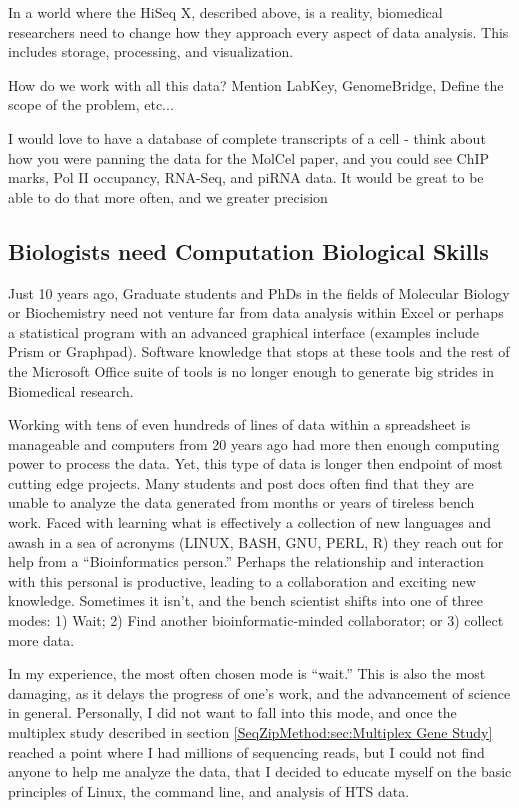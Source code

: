     In a world where the HiSeq X, described above, is a reality, biomedical researchers need to change how they approach every aspect of data analysis. This includes storage, processing, and visualization. 

    How do we work with all this data? Mention LabKey, GenomeBridge, Define the scope of the problem, etc...

    I would love to have a database of complete transcripts of a cell - think about how you were panning the data for the MolCel paper, and you could see ChIP marks, Pol II occupancy, RNA-Seq, and piRNA data. It would be great to be able to do that more often, and we greater precision

  \subsection{Biologists need Computation Biological Skills}
    \label{Disc:subsec:Biologists need Comp Skills}

    Just 10 years ago,  Graduate students and PhDs in the fields of Molecular Biology or Biochemistry need not venture far from data analysis within Excel or perhaps a statistical program with an advanced graphical interface (examples include Prism or Graphpad). Software knowledge that stops at these tools and the rest of the Microsoft Office suite of tools is no longer enough to generate big strides in Biomedical research.

    Working with tens of even hundreds of lines of data within a spreadsheet is manageable and computers from 20 years ago had more then enough computing power to process the data. Yet, this type of data is longer then endpoint of most cutting edge projects. Many students and post docs often find that they are unable to analyze the data generated from months or years of tireless bench work. Faced with learning what is effectively a collection of new languages and awash in a sea of acronyms (LINUX, BASH, GNU, PERL, R) they reach out for help from a ``Bioinformatics person.'' Perhaps the relationship and interaction with this personal is productive, leading to a collaboration and exciting new knowledge. Sometimes it isn't, and the bench scientist shifts into one of three modes: 1) Wait; 2) Find another bioinformatic-minded collaborator; or 3) collect more data.

    In my experience, the most often chosen mode is ``wait.'' This is also the most damaging, as it delays the progress of one's work, and the advancement of science in general. Personally, I did not want to fall into this mode, and once the multiplex study described in section \ref{SeqZipMethod:sec:Multiplex Gene Study} reached a point where I had millions of sequencing reads, but I could not find anyone to help me analyze the data, that I decided to educate myself on the basic principles of Linux, the command line, and analysis of HTS data.

